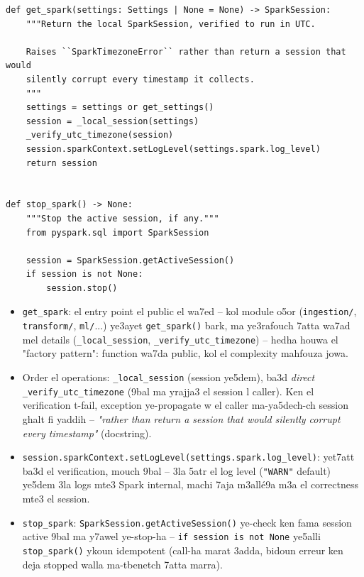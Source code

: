 \documentclass[11pt,a4paper]{report}
\DeclareRobustCommand{\code}[1]{\texttt{#1}}
\begin{document}
\begin{lstlisting}[style=pystyle]
def get_spark(settings: Settings | None = None) -> SparkSession:
    """Return the local SparkSession, verified to run in UTC.

    Raises ``SparkTimezoneError`` rather than return a session that would
    silently corrupt every timestamp it collects.
    """
    settings = settings or get_settings()
    session = _local_session(settings)
    _verify_utc_timezone(session)
    session.sparkContext.setLogLevel(settings.spark.log_level)
    return session


def stop_spark() -> None:
    """Stop the active session, if any."""
    from pyspark.sql import SparkSession

    session = SparkSession.getActiveSession()
    if session is not None:
        session.stop()
\end{lstlisting}

\begin{itemize}
  \item \code{get\_spark}: el entry point el public el wa7ed -- kol module
        o5or (\code{ingestion/}, \code{transform/}, \code{ml/}...) ye3ayet
        \code{get\_spark()} bark, ma ye3rafouch 7atta wa7ad mel details
        (\code{\_local\_session}, \code{\_verify\_utc\_timezone}) -- hedha
        houwa el "factory pattern": function wa7da public, kol el complexity
        mahfouza jowa.
  \item Order el operations: \code{\_local\_session} (session ye5dem),
        ba3d \emph{direct} \code{\_verify\_utc\_timezone} (9bal ma yrajja3
        el session l caller). Ken el verification t-fail, exception
        ye-propagate w el caller ma-ya5dech-ch session ghalt fi yaddih --
        \emph{"rather than return a session that would silently corrupt every
        timestamp"} (docstring).
  \item \code{session.sparkContext.setLogLevel(settings.spark.log\_level)}:
        yet7att ba3d el verification, mouch 9bal -- 3la 5atr el log level
        (\code{"WARN"} default) ye5dem 3la logs mte3 Spark internal, machi
        7aja m3allé9a m3a el correctness mte3 el session.
  \item \code{stop\_spark}: \code{SparkSession.getActiveSession()} ye-check
        ken fama session active 9bal ma y7awel ye-stop-ha -- \code{if session
        is not None} ye5alli \code{stop\_spark()} ykoun idempotent (call-ha
        marat 3adda, bidoun erreur ken deja stopped walla ma-tbenetch 7atta
        marra).
\end{itemize}
\end{document}
